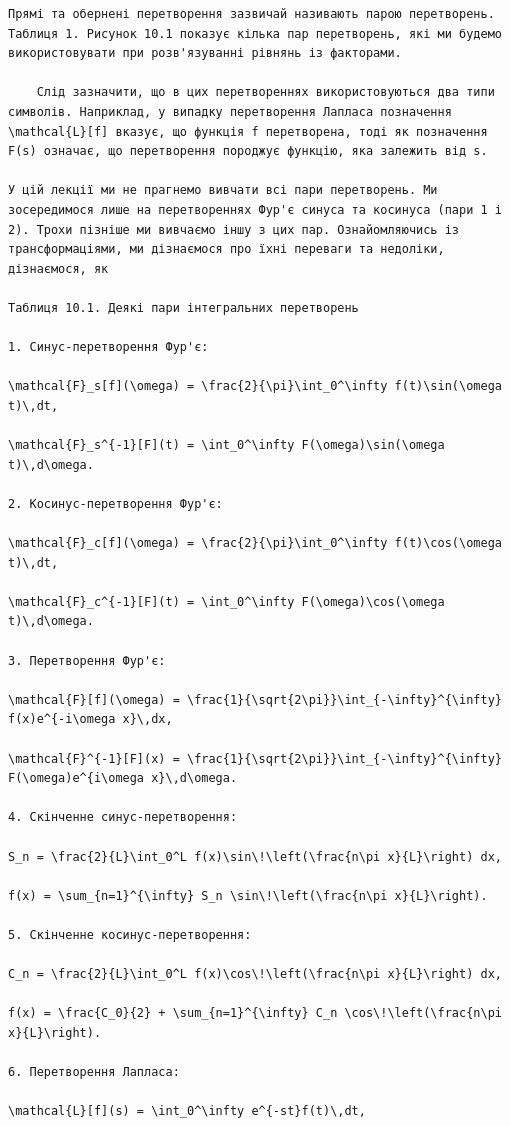 \documentclass[
  ukrainian,
]{article}
\begin{document}
\begin{verbatim}
Прямі та обернені перетворення зазвичай називають парою перетворень. Таблиця 1. Рисунок 10.1 показує кілька пар перетворень, які ми будемо використовувати при розв'язуванні рівнянь із факторами.

    Слід зазначити, що в цих перетвореннях використовуються два типи символів. Наприклад, у випадку перетворення Лапласа позначення \mathcal{L}[f] вказує, що функція f перетворена, тоді як позначення F(s) означає, що перетворення породжує функцію, яка залежить від s.

У цій лекції ми не прагнемо вивчати всі пари перетворень. Ми зосередимося лише на перетвореннях Фур'є синуса та косинуса (пари 1 і 2). Трохи пізніше ми вивчаємо іншу з цих пар. Ознайомляючись із трансформаціями, ми дізнаємося про їхні переваги та недоліки, дізнаємося, як

Таблиця 10.1. Деякі пари інтегральних перетворень

1. Синус-перетворення Фур'є:

\mathcal{F}_s[f](\omega) = \frac{2}{\pi}\int_0^\infty f(t)\sin(\omega t)\,dt,

\mathcal{F}_s^{-1}[F](t) = \int_0^\infty F(\omega)\sin(\omega t)\,d\omega.

2. Косинус-перетворення Фур'є:

\mathcal{F}_c[f](\omega) = \frac{2}{\pi}\int_0^\infty f(t)\cos(\omega t)\,dt,

\mathcal{F}_c^{-1}[F](t) = \int_0^\infty F(\omega)\cos(\omega t)\,d\omega.

3. Перетворення Фур'є:

\mathcal{F}[f](\omega) = \frac{1}{\sqrt{2\pi}}\int_{-\infty}^{\infty} f(x)e^{-i\omega x}\,dx,

\mathcal{F}^{-1}[F](x) = \frac{1}{\sqrt{2\pi}}\int_{-\infty}^{\infty} F(\omega)e^{i\omega x}\,d\omega.

4. Скінченне синус-перетворення:

S_n = \frac{2}{L}\int_0^L f(x)\sin\!\left(\frac{n\pi x}{L}\right) dx,

f(x) = \sum_{n=1}^{\infty} S_n \sin\!\left(\frac{n\pi x}{L}\right).

5. Скінченне косинус-перетворення:

C_n = \frac{2}{L}\int_0^L f(x)\cos\!\left(\frac{n\pi x}{L}\right) dx,

f(x) = \frac{C_0}{2} + \sum_{n=1}^{\infty} C_n \cos\!\left(\frac{n\pi x}{L}\right).

6. Перетворення Лапласа:

\mathcal{L}[f](s) = \int_0^\infty e^{-st}f(t)\,dt,


\end{verbatim}
\end{document}
